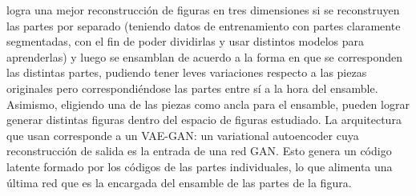 \documentclass[spanish]{article}
\begin{document}

\cite{Li2019} logra una mejor reconstrucción de figuras en tres dimensiones si se reconstruyen las partes por separado (teniendo datos de entrenamiento con partes claramente segmentadas, con el fin de poder dividirlas y usar distintos modelos para aprenderlas) y luego se ensamblan de acuerdo a la forma en que se corresponden las distintas partes, pudiendo tener leves variaciones respecto a las piezas originales pero correspondiéndose las partes entre sí a la hora del ensamble. Asimismo, eligiendo una de las piezas como ancla para el ensamble, pueden lograr generar distintas figuras dentro del espacio de figuras estudiado. La arquitectura que usan corresponde a un VAE-GAN: un variational autoencoder cuya reconstrucción de salida es la entrada de una red GAN. Esto genera un código latente formado por los códigos de las partes individuales, lo que alimenta una última red que es la encargada del ensamble de las partes de la figura.

\end{document}
